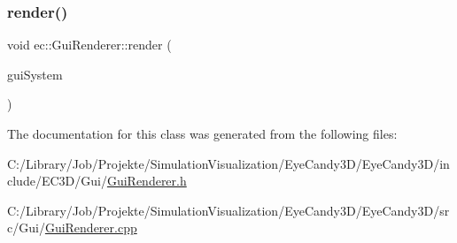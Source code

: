 \mbox{\label{classec_1_1_gui_renderer_af9573af245feb6ab252fb6c060344e7b}} 
\subsubsection{\texorpdfstring{render()}{render()}}
{\footnotesize\ttfamily void ec\+::\+Gui\+Renderer\+::render (\begin{DoxyParamCaption}\item[{const \mbox{\hyperlink{classec_1_1_gui_system}{Gui\+System}} \&}]{gui\+System }\end{DoxyParamCaption})}



The documentation for this class was generated from the following files\+:\begin{DoxyCompactItemize}
\item 
C\+:/\+Library/\+Job/\+Projekte/\+Simulation\+Visualization/\+Eye\+Candy3\+D/\+Eye\+Candy3\+D/include/\+E\+C3\+D/\+Gui/\mbox{\hyperlink{_gui_renderer_8h}{Gui\+Renderer.\+h}}\item 
C\+:/\+Library/\+Job/\+Projekte/\+Simulation\+Visualization/\+Eye\+Candy3\+D/\+Eye\+Candy3\+D/src/\+Gui/\mbox{\hyperlink{_gui_renderer_8cpp}{Gui\+Renderer.\+cpp}}\end{DoxyCompactItemize}
